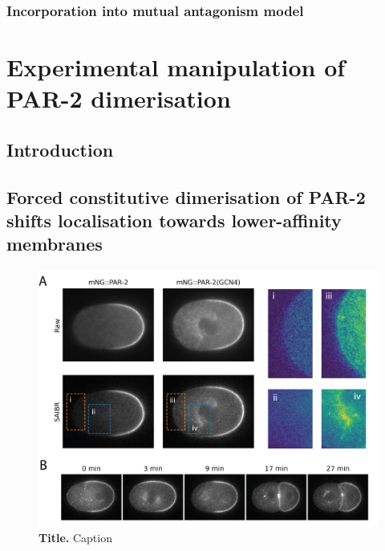 \documentclass[12pt]{"article"}
\newcommand{\mycaption}[2]{\caption[#1]{\textbf{#1.} #2}}
\begin{document}
\subsubsection{Incorporation into mutual antagonism model}


\clearpage
\section{Experimental manipulation of PAR-2 dimerisation}

\subsection{Introduction}

\subsection{Forced constitutive dimerisation of PAR-2 shifts localisation towards lower-affinity membranes}



\begin{figure}[!h]
\includegraphics[scale=1]{gcn4}
\setlength{\abovecaptionskip}{20pt}
\centering
\mycaption{Title}{Caption}
\label{fig:gcn4}
\end{figure}
\end{document}
